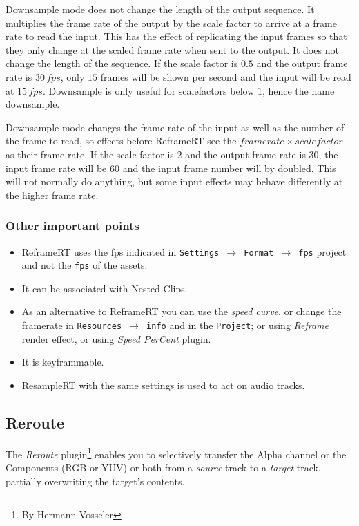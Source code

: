 Downsample mode does not change the length of the output sequence. It multiplies the frame rate of the output by the scale factor to arrive at a frame rate to read the input. This has the effect of replicating the input frames so that they only change at the scaled frame rate when sent to the output. It does not change the length of the sequence. If the scale factor is $0.5$ and the output frame rate is $30 \,fps$, only $15$ frames will be shown per second and the input will be read at $15 \,fps$. Downsample is only useful for scalefactors below $1$, hence the name downsample.

Downsample mode changes the frame rate of the input as well as the number of the frame to read, so effects before ReframeRT see the $frame rate \times scale factor$ as their frame rate. If the scale factor is $2$ and the output frame rate is $30$, the input frame rate will be $60$ and the input frame number will by doubled. This will not normally do anything, but some input effects may behave differently at the higher frame rate.

\subsubsection*{Other important points}%
\label{ssub:other_important_points}

\begin{itemize}
    \item ReframeRT uses the fps indicated in \texttt{Settings $\rightarrow$ Format $\rightarrow$ fps} project and not the \texttt{fps} of the assets.
    \item It can be associated with Nested Clips.
    \item As an alternative to ReframeRT you can use the \textit{speed curve}, or change the framerate in \texttt{Resources $\rightarrow$ info} and in the \texttt{Project}; or using \textit{Reframe} render effect, or using \textit{Speed PerCent} plugin.
    \item It is keyframmable.
    \item ResampleRT with the same settings is used to act on audio tracks.
\end{itemize}

\subsection{Reroute}%
\label{sub:reroute}

The \textit{Reroute} plugin\protect\footnote{By Hermann Vosseler} enables you to selectively transfer the Alpha channel or the Components (RGB or YUV) or both from a \textit{source} track to a \textit{target} track, partially overwriting the target's contents.

